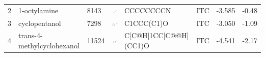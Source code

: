 \documentclass[aps,pre,twocolumn,nofootinbib,superscriptaddress,10pt, final,tightenlines]{revtex4-1}
\begin{document}
\begin{table}
\begin{tabular}{lllp{2cm}>{\ttfamily}llS[table-format=-1.3, table-figures-uncertainty=1]S[table-format=-1.2, table-figures-uncertainty=1]}
2    & 1-octylamine                & 8143     & \parbox[c]{1em}{\includegraphics[scale=0.2]{figures/8143.pdf}}   & CCCCCCCCN               & ITC    & -3.585   & -0.48  \\
3    & cyclopentanol               & 7298     & \parbox[c]{1em}{\includegraphics[scale=0.2]{figures/7298.pdf}}   & C1CCC(C1)O              & ITC    & -3.050   & -1.09  \\
4    & trans-4-methylcyclohexanol  & 11524    & \parbox[c]{1em}{\includegraphics[scale=0.2]{figures/11524.pdf}}  & C[C@H]1CC[C@@H](CC1)O   & ITC    & -4.541   & -2.17  \\

\end{tabular}
\end{table}
\end{document}
